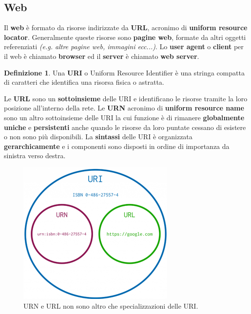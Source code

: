 \documentclass[11pt,a4paper,oneside]{book}
\theoremstyle{definition}
\newtheorem{definition}{Definizione}[section]
\begin{document}
\subsection{Web}
Il \textbf{web} è formato da risorse indirizzate da \textbf{URL}, acronimo di \textbf{uniform resource locator}. Generalmente queste risorse sono \textbf{pagine web}, formate da altri oggetti referenziati \textit{(e.g. altre pagine web, immagini ecc...)}. Lo \textbf{user agent} o \textbf{client} per il web è chiamato \textbf{browser} ed il \textbf{server} è chiamato \textbf{web server}.
\theoremstyle{definition}
\begin{definition}
	Una \textbf{URI} o Uniform Resource Identifier è una stringa compatta di caratteri che identifica una risorsa fisica o astratta.
\end{definition}
Le \textbf{URL} sono un \textbf{sottoinsieme} delle URI e identificano le risorse tramite la loro posizione all'interno della rete. Le \textbf{URN} acronimo di \textbf{uniform resource name} sono un altro sottoinsieme delle URI la cui funzione è di rimanere \textbf{globalmente uniche} e \textbf{persistenti} anche quando le risorse da loro puntate cessano di esistere o non sono più disponibili.
La \textbf{sintassi} delle URI è organizzata \textbf{gerarchicamente} e i componenti sono disposti in ordine di importanza da sinistra verso destra.
\begin{figure}[!h]
	\includegraphics[scale=0.4]{Immagini/URIvsURL.png}
	\centering
	\caption{URN e URL non sono altro che specializzazioni delle URI.}
\end{figure}

\pagebreak
\end{document}
